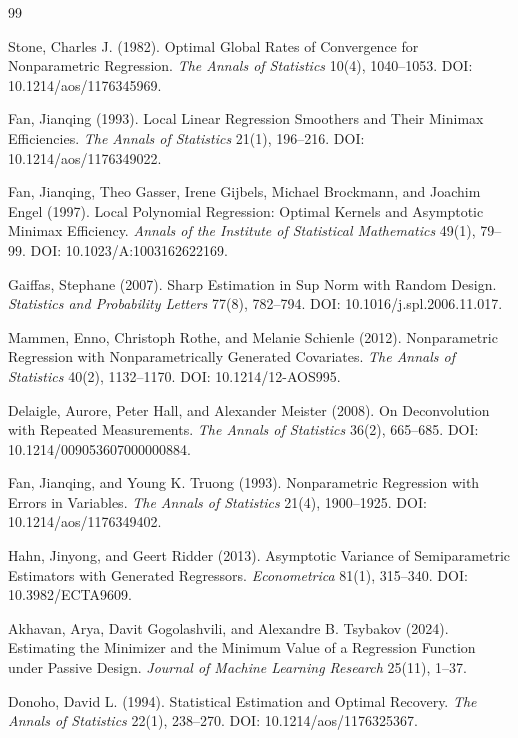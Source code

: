 \documentclass{article}
\begin{document}
\begin{thebibliography}{99}

   Stone, Charles J. (1982). Optimal Global Rates of Convergence for Nonparametric Regression. \emph{The Annals of Statistics} 10(4), 1040--1053. DOI: 10.1214/aos/1176345969.

   Fan, Jianqing (1993). Local Linear Regression Smoothers and Their Minimax Efficiencies. \emph{The Annals of Statistics} 21(1), 196--216. DOI: 10.1214/aos/1176349022.

   Fan, Jianqing, Theo Gasser, Irene Gijbels, Michael Brockmann, and Joachim Engel (1997). Local Polynomial Regression: Optimal Kernels and Asymptotic Minimax Efficiency. \emph{Annals of the Institute of Statistical Mathematics} 49(1), 79--99. DOI: 10.1023/A:1003162622169.

   Gaiffas, Stephane (2007). Sharp Estimation in Sup Norm with Random Design. \emph{Statistics and Probability Letters} 77(8), 782--794. DOI: 10.1016/j.spl.2006.11.017.

   Mammen, Enno, Christoph Rothe, and Melanie Schienle (2012). Nonparametric Regression with Nonparametrically Generated Covariates. \emph{The Annals of Statistics} 40(2), 1132--1170. DOI: 10.1214/12-AOS995.

   Delaigle, Aurore, Peter Hall, and Alexander Meister (2008). On Deconvolution with Repeated Measurements. \emph{The Annals of Statistics} 36(2), 665--685. DOI: 10.1214/009053607000000884.

   Fan, Jianqing, and Young K. Truong (1993). Nonparametric Regression with Errors in Variables. \emph{The Annals of Statistics} 21(4), 1900--1925. DOI: 10.1214/aos/1176349402.

   Hahn, Jinyong, and Geert Ridder (2013). Asymptotic Variance of Semiparametric Estimators with Generated Regressors. \emph{Econometrica} 81(1), 315--340. DOI: 10.3982/ECTA9609.

   Akhavan, Arya, Davit Gogolashvili, and Alexandre B. Tsybakov (2024). Estimating the Minimizer and the Minimum Value of a Regression Function under Passive Design. \emph{Journal of Machine Learning Research} 25(11), 1--37.

   Donoho, David L. (1994). Statistical Estimation and Optimal Recovery. \emph{The Annals of Statistics} 22(1), 238--270. DOI: 10.1214/aos/1176325367.


\end{thebibliography}
\end{document}
